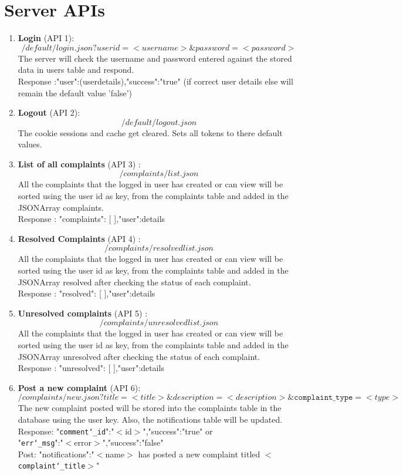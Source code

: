 \documentclass[a4paper]{article}
\begin{document}
\section{Server APIs}
\begin{enumerate}
\item \textbf{Login} (API 1): $$/default/login.json?userid=<username>\&password=<password> $$
The server will check the username and password entered against the stored data in users table and respond.\\
Response :{"user":{(userdetails)},"success":"true"} (if correct user details else will remain the default value 'false')
\item\textbf{ Logout} (API 2): 
$$/default/logout.json$$
The cookie sessions and cache get cleared. Sets all tokens to there default values.

\item \textbf{List of all complaints} (API 3) :
$$/complaints/list.json$$
All the complaints that the logged in user has created or can view will be sorted using the user id as key, from the complaints table and added in the JSONArray complaints.\\
Response : {"complaints": [ ],"user":{details}}

\item \textbf{Resolved Complaints} (API 4) :$$ /complaints/resolvedlist.json $$
All the complaints that the logged in user has created or can view will be sorted using the user id as key, from the complaints table and added in the JSONArray resolved after checking the status of each complaint.\\
Response : {"resolved": [ ],"user":{details}}

\item \textbf{Unresolved complaints} (API 5) :$$ /complaints/unresolvedlist.json $$
All the complaints that the logged in user has created or can view will be sorted using the user id as key, from the complaints table and added in the JSONArray unresolved after checking the status of each complaint.\\
Response : {"unresolved": [ ],"user":{details}}

\item \textbf{Post a new complaint} (API 6):$$ /complaints/new.json?title=<title>\&description=<description>\& \texttt{complaint\char`_type}=<type> $$
The new complaint posted will be stored into the complaints table in the database using the user key. Also, the notifications table will be updated.\\
Response: {"\texttt{comment\char`_id}":"$<$id$>$","success":"true"} or \\
		{"\texttt{err\char`_msg}":"$<$error$>$","success":"false"} \\
Post: "notifications":"$<$name$>$ has posted a new complaint titled $<$\texttt{complaint\char`_title}$>$"


\end{enumerate}
\end{document}

